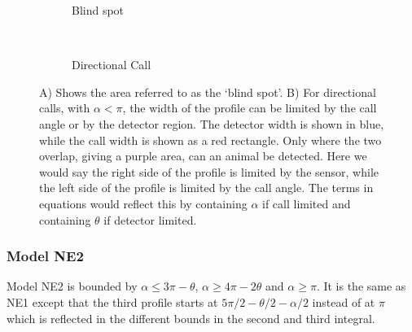 


\begin{figure}[t]
        \centering
        \begin{subfigure}[t]{0.3\textwidth}
                \centering
                \caption{Blind spot}
                \label{f:blindSpot}
        \end{subfigure}
~ 
        \begin{subfigure}[t]{0.3\textwidth}
                \centering
                \caption{Directional Call}
                \label{f:callExplained}
        \end{subfigure}
\caption{A) Shows the area referred to as the `blind spot'. B) For directional calls, with $\alpha<\pi$, the width of the profile can be limited by the call angle or by the detector region.  The detector width is shown in blue, while the call width is shown as a red rectangle. Only where the two overlap, giving a purple area, can an animal be detected. Here we would say the right side of the profile is limited by the sensor, while the left side of the profile is limited by the call angle. The terms in equations would reflect this by containing $\alpha$ if call limited and containing $\theta$ if detector limited.  }
\label{f:NE}
\end{figure}




\subsubsection{Model NE2} \label{NE2}

Model NE2 is bounded by $\alpha \le 3\pi - \theta$, $\alpha \ge 4\pi - 2\theta$ and $\alpha \ge \pi$. It is the same as NE1 except that the third profile starts at $5\pi/2 - \theta/2 - \alpha/2$ instead of at $\pi$ which is reflected in the different bounds in the second and third integral.

